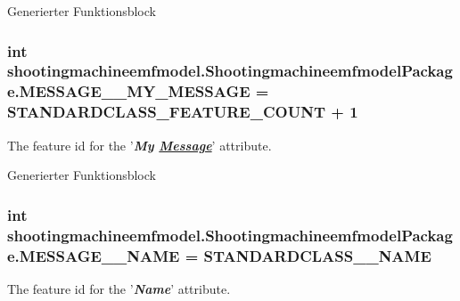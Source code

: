 Generierter Funktionsblock  \hypertarget{interfaceshootingmachineemfmodel_1_1_shootingmachineemfmodel_package_a73a9b27935f74a04999cbd904026a86f}{
\subsubsection[{M\-E\-S\-S\-A\-G\-E\-\_\-\-\_\-\-M\-Y\-\_\-\-M\-E\-S\-S\-A\-G\-E}]{\setlength{\rightskip}{0pt plus 5cm}int shootingmachineemfmodel.\-Shootingmachineemfmodel\-Package.\-M\-E\-S\-S\-A\-G\-E\-\_\-\-\_\-\-M\-Y\-\_\-\-M\-E\-S\-S\-A\-G\-E = {\bf S\-T\-A\-N\-D\-A\-R\-D\-C\-L\-A\-S\-S\-\_\-\-F\-E\-A\-T\-U\-R\-E\-\_\-\-C\-O\-U\-N\-T} + 1}}\label{interfaceshootingmachineemfmodel_1_1_shootingmachineemfmodel_package_a73a9b27935f74a04999cbd904026a86f}
The feature id for the '{\itshape {\bfseries My \hyperlink{interfaceshootingmachineemfmodel_1_1_message}{Message}}}' attribute.

Generierter Funktionsblock  \hypertarget{interfaceshootingmachineemfmodel_1_1_shootingmachineemfmodel_package_a06b089367823068502816e69da5d9962}{
\subsubsection[{M\-E\-S\-S\-A\-G\-E\-\_\-\-\_\-\-N\-A\-M\-E}]{\setlength{\rightskip}{0pt plus 5cm}int shootingmachineemfmodel.\-Shootingmachineemfmodel\-Package.\-M\-E\-S\-S\-A\-G\-E\-\_\-\-\_\-\-N\-A\-M\-E = {\bf S\-T\-A\-N\-D\-A\-R\-D\-C\-L\-A\-S\-S\-\_\-\-\_\-\-N\-A\-M\-E}}}\label{interfaceshootingmachineemfmodel_1_1_shootingmachineemfmodel_package_a06b089367823068502816e69da5d9962}
The feature id for the '{\itshape {\bfseries Name}}' attribute.

